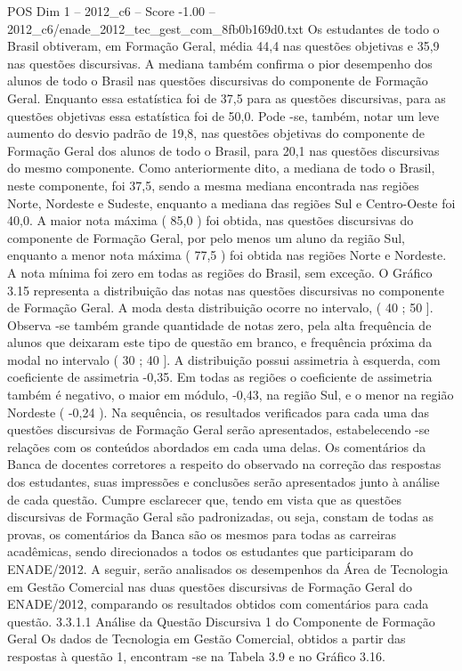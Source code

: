 \begin{textsample}{POS Dim 1 – 2012\_c6 – Score -1.00 – 2012\_c6/enade\_2012\_tec\_gest\_com\_8fb0b169d0.txt}
Os estudantes de todo o Brasil obtiveram, em Formação Geral, média 44,4 nas questões objetivas e 35,9 nas questões discursivas.
A mediana também confirma o pior desempenho dos alunos de todo o Brasil nas questões discursivas do componente de Formação Geral.
Enquanto essa estatística foi de 37,5 para as questões discursivas, para as questões objetivas essa estatística foi de 50,0.
Pode -se, também, notar um leve aumento do desvio padrão de 19,8, nas questões objetivas do componente de Formação Geral dos alunos de todo o Brasil, para 20,1 nas questões discursivas do mesmo componente.
Como anteriormente dito, a mediana de todo o Brasil, neste componente, foi 37,5, sendo a mesma mediana encontrada nas regiões Norte, Nordeste e Sudeste, enquanto a mediana das regiões Sul e Centro-Oeste foi 40,0.
A maior nota máxima ( 85,0 ) foi obtida, nas questões discursivas do componente de Formação Geral, por pelo menos um aluno da região Sul, enquanto a menor nota máxima ( 77,5 ) foi obtida nas regiões Norte e Nordeste.
A nota mínima foi zero em todas as regiões do Brasil, sem exceção.
O Gráfico 3.15 representa a distribuição das notas nas questões discursivas no componente de Formação Geral.
A moda desta distribuição ocorre no intervalo, ( 40 ; 50 ].
Observa -se também grande quantidade de notas zero, pela alta frequência de alunos que deixaram este tipo de questão em branco, e frequência próxima da modal no intervalo ( 30 ; 40 ].
A distribuição possui assimetria à esquerda, com coeficiente de assimetria -0,35.
Em todas as regiões o coeficiente de assimetria também é negativo, o maior em módulo, -0,43, na região Sul, e o menor na região Nordeste ( -0,24 ).
Na sequência, os resultados verificados para cada uma das questões discursivas de Formação Geral serão apresentados, estabelecendo -se relações com os conteúdos abordados em cada uma delas.
Os comentários da Banca de docentes corretores a respeito do observado na correção das respostas dos estudantes, suas impressões e conclusões serão apresentados junto à análise de cada questão.
Cumpre esclarecer que, tendo em vista que as questões discursivas de Formação Geral são padronizadas, ou seja, constam de todas as provas, os comentários da Banca são os mesmos para todas as carreiras acadêmicas, sendo direcionados a todos os estudantes que participaram do ENADE/2012.
A seguir, serão analisados os desempenhos da Área de Tecnologia em Gestão Comercial nas duas questões discursivas de Formação Geral do ENADE/2012, comparando os resultados obtidos com comentários para cada questão. 3.3.1.1 Análise da Questão Discursiva 1 do Componente de Formação Geral Os dados de Tecnologia em Gestão Comercial, obtidos a partir das respostas à questão 1, encontram -se na Tabela 3.9 e no Gráfico 3.16.

\end{textsample}
